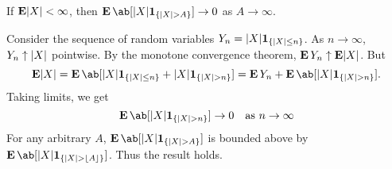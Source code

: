 \documentclass[12pt]{article}
\begin{document}
\begin{problem*}
    If $\operatorname{\mathbf E}\lvert X\rvert < \infty$, then $\E\ab[\abs X \1{\set{\abs X > A}}] \to 0$
    as $A \to \infty$.
\end{problem*}
\begin{solution}
    Consider the sequence of random variables
    $Y_n = \lvert X\rvert \bm{1}_{\{\lvert X\rvert \le n\}}$.
    As $n \to \infty$, $Y_n \uparrow \lvert X\rvert$ pointwise.
    By the monotone convergence theorem,
    $\operatorname{\mathbf E} Y_n \uparrow \operatorname{\mathbf E}\lvert X\rvert$.
    But \[
        \E\abs X
        = \E\ab[\abs X \1{\set{\abs X \le n}} + \abs X \1{\set{\abs X > n}}]
        = \E Y_n + \E\ab[\abs X \1{\set{\abs X > n}}].
    \] Taking limits, we get \[
        \E\ab[\abs X \1{\set{\abs X > n}}] \to 0
        \quad\text{as } n \to \infty
    \] For any arbitrary $A$, $\E\ab[\abs X \1{\set{\abs X > A}}]$ is
    bounded above by $\E\ab[\abs X \1{\set{\abs X > \floor{A}}}]$.
    Thus the result holds.
\end{solution}
\end{document}

